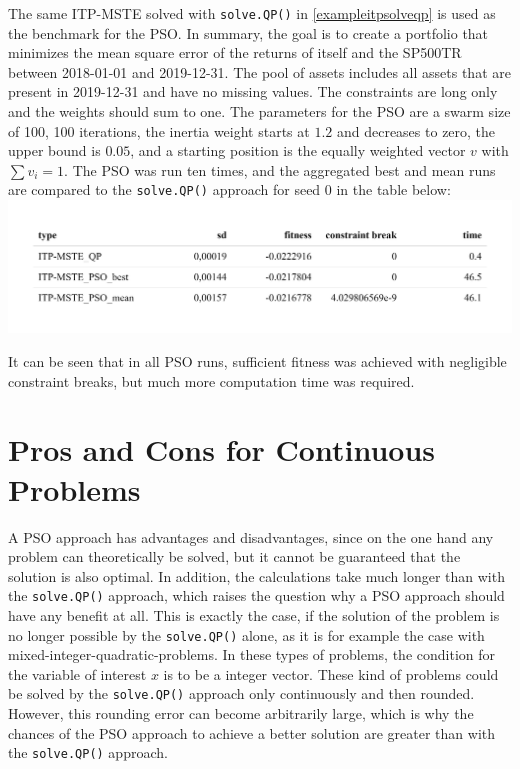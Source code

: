 \documentclass[
  oneside]{book}
\begin{document}
The same ITP-MSTE solved with \texttt{solve.QP()} in \ref{exampleitpsolveqp} is used as the benchmark for the PSO. In summary, the goal is to create a portfolio that minimizes the mean square error of the returns of itself and the SP500TR between 2018-01-01 and 2019-12-31. The pool of assets includes all assets that are present in 2019-12-31 and have no missing values. The constraints are long only and the weights should sum to one. The parameters for the PSO are a swarm size of 100, 100 iterations, the inertia weight starts at \(1.2\) and decreases to zero, the upper bound is \(0.05\), and a starting position is the equally weighted vector \(v\) with \(\textstyle\sum v_i=1\). The PSO was run ten times, and the aggregated best and mean runs are compared to the \texttt{solve.QP()} approach for seed 0 in the table below:
\includegraphics{Master_Thesis_files/figure-latex/pso8-1.png}

It can be seen that in all PSO runs, sufficient fitness was achieved with negligible constraint breaks, but much more computation time was required.

\hypertarget{pros-and-cons-for-continuous-problems}{%
\section{Pros and Cons for Continuous Problems}\label{pros-and-cons-for-continuous-problems}}

A PSO approach has advantages and disadvantages, since on the one hand any problem can theoretically be solved, but it cannot be guaranteed that the solution is also optimal. In addition, the calculations take much longer than with the \texttt{solve.QP()} approach, which raises the question why a PSO approach should have any benefit at all. This is exactly the case, if the solution of the problem is no longer possible by the \texttt{solve.QP()} alone, as it is for example the case with mixed-integer-quadratic-problems. In these types of problems, the condition for the variable of interest \(x\) is to be a integer vector. These kind of problems could be solved by the \texttt{solve.QP()} approach only continuously and then rounded. However, this rounding error can become arbitrarily large, which is why the chances of the PSO approach to achieve a better solution are greater than with the \texttt{solve.QP()} approach.
\end{document}
